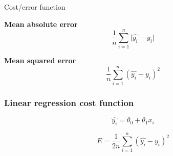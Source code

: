 \begin{frame}{Cost/error function}
  \begin{minipage}[l]{0.40\linewidth}
  \textbf{Mean absolute error}
    \[
      \frac{1}{n}\sum_{i=1}^n \lvert \hat{y_i} - y_i \rvert
    \]

  \textbf{Mean squared error}
    \[
      \frac{1}{n}\sum_{i=1}^n( \hat{y_i} - y_i )^2
    \]
  \end{minipage}\hfill
  \begin{minipage}[l]{0.59\linewidth}
  \end{minipage}\hfill
\end{frame}

\begin{frame}
  \frametitle{Linear regression cost function}
  \begin{minipage}[l]{0.49\linewidth}
    \[
      \hat{y_i} = \theta_0 + \theta_1 x_i
    \]
  \end{minipage}\hfill
  \begin{minipage}[l]{0.49\linewidth}
    \[
      \boxed{E = \frac{1}{2n}\sum_{i=1}^n( \hat{y_i} - y_i )^2}
    \]
  \end{minipage}\hfill
\end{frame}
